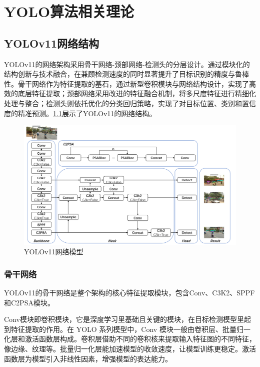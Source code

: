 
\chapter{YOLO算法相关理论}

\section{YOLOv11网络结构}
YOLOv11的网络架构采用骨干网络-颈部网络-检测头的分层设计。通过模块化的结构创新与技术融合，在兼顾检测速度的同时显著提升了目标识别的精度与鲁棒性。骨干网络作为特征提取的基石，通过新型卷积模块与网络结构设计，实现了高效的底层特征提取；颈部网络采用改进的特征融合机制，将多尺度特征进行精细化处理与整合；检测头则依托优化的分类回归策略，实现了对目标位置、类别和置信度的精准预测。\ref{fig:s}展示了YOLOv11的网络结构。
\begin{figure}[!htb]
  \centering
  \includegraphics[width=1\textwidth]{figs/chap02/yolov11.png}
  \caption{YOLOv11网络模型}
  \label{fig:s}
\end{figure}

\subsection{骨干网络}
YOLOv11的骨干网络是整个架构的核心特征提取模块，包含Conv、C3K2、SPPF和C2PSA模块。

Conv模块即卷积模块，它是深度学习里基础且关键的模块，在目标检测模型里起到特征提取的作用。在 YOLO 系列模型中，Conv 模块一般由卷积层、批量归一化层和激活函数层构成。卷积层借助不同的卷积核来提取输入特征图的不同特征，像边缘、纹理等。批量归一化层能加速模型的收敛速度，让模型训练更稳定。激活函数层为模型引入非线性因素，增强模型的表达能力。

